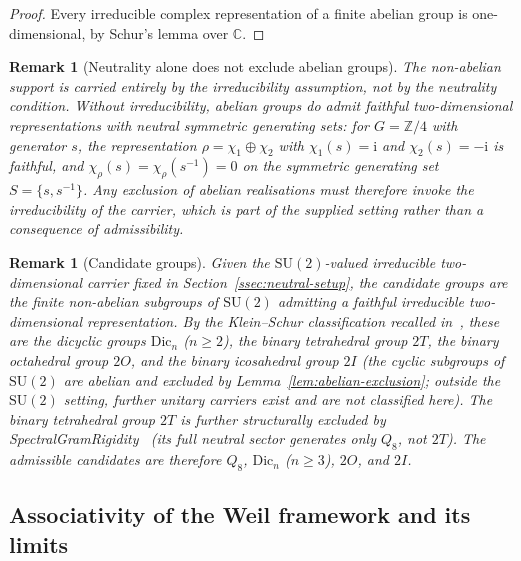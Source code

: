 \documentclass[11pt,a4paper]{article}
\newtheorem{remark}[theorem]{Remark}
\newcommand{\SU}{\mathrm{SU}}
\begin{document}
    \begin{proof}
      Every irreducible complex representation of a finite abelian group is
      one-dimensional, by Schur's lemma over $\mathbb{C}$.
    \end{proof}

    \begin{remark}[Neutrality alone does not exclude abelian groups]
      \label{rem:neutrality-not-enough}
      The non-abelian support is carried entirely by the irreducibility assumption, not by
      the neutrality condition.
      Without irreducibility, abelian groups do admit faithful two-dimensional
      representations with neutral symmetric generating sets: for $G = \mathbb{Z}/4$ with
      generator $s$, the representation
      $\rho = \chi_{1} \oplus \chi_{2}$ with $\chi_{1}(s) = \mathrm{i}$ and
      $\chi_{2}(s) = -\mathrm{i}$ is faithful, and
      $\chi_{\rho}(s) = \chi_{\rho}(s^{-1}) = 0$ on the symmetric generating set
      $S = \{s, s^{-1}\}$.
      Any exclusion of abelian realisations must therefore invoke the irreducibility of
      the carrier, which is part of the supplied setting rather than a consequence of
      admissibility.
    \end{remark}

    \begin{remark}[Candidate groups]
      \label{rem:exclusion-scope}
      Given the $\SU(2)$-valued irreducible two-dimensional carrier fixed in
      Section~\ref{ssec:neutral-setup}, the candidate groups are the finite non-abelian
      subgroups of $\SU(2)$ admitting a faithful irreducible two-dimensional
      representation.
      By the Klein--Schur classification recalled in~\cite{Beau2026a3}, these are the
      dicyclic groups $\mathrm{Dic}_{n}$ ($n \geq 2$), the binary tetrahedral group $2T$,
      the binary octahedral group $2O$, and the binary icosahedral group $2I$ (the cyclic
      subgroups of $\SU(2)$ are abelian and excluded by Lemma~\ref{lem:abelian-exclusion};
      outside the $\SU(2)$ setting, further unitary carriers exist and are not classified
      here).
      The binary tetrahedral group $2T$ is further structurally excluded by
      SpectralGramRigidity~\cite{Beau2026a3} (its full neutral sector generates
      only $Q_{8}$, not $2T$).
      The admissible candidates are therefore $Q_{8}$,
      $\mathrm{Dic}_{n}$ ($n \geq 3$), $2O$, and $2I$.
    \end{remark}

  \subsection{Associativity of the Weil framework and its limits}
    \label{ssec:octonion-exclusion}
\end{document}
